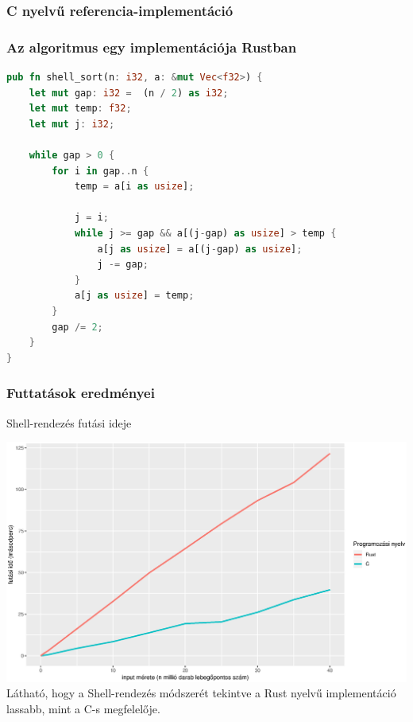 \subsubsection{C nyelvű referencia-implementáció}
\subsubsection{Az algoritmus egy implementációja Rustban}
\begin{lstlisting}[language=Rust]
pub fn shell_sort(n: i32, a: &mut Vec<f32>) {
	let mut gap: i32 =  (n / 2) as i32;
	let mut temp: f32;
	let mut j: i32;
	
	while gap > 0 {
		for i in gap..n {
			temp = a[i as usize];
			
			j = i;
			while j >= gap && a[(j-gap) as usize] > temp {
				a[j as usize] = a[(j-gap) as usize];
				j -= gap;
			}
			a[j as usize] = temp;
		}
		gap /= 2;
	}
}
\end{lstlisting}
\subsubsection{Futtatások eredményei} %
Shell-rendezés futási ideje

\includegraphics[width=15.5cm]{kepek/shell_run.eps}
Látható, hogy a Shell-rendezés módszerét tekintve a Rust nyelvű implementáció lassabb, mint a C-s megfelelője.

